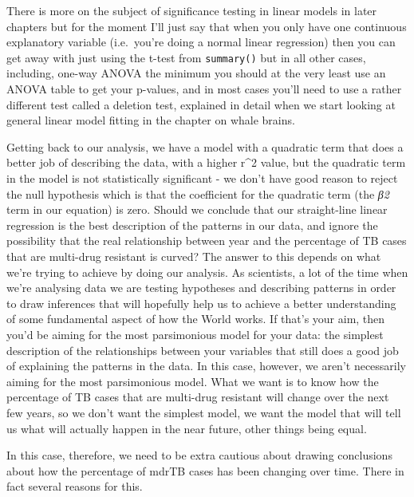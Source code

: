 \documentclass[
]{book}
\begin{document}
There is more on the subject of significance testing in linear models in later chapters but for the moment I'll just say that when you only have one continuous explanatory variable (i.e.~you're doing a normal linear regression) then you can get away with just using the t-test from \texttt{summary()} but in all other cases, including, one-way ANOVA the minimum you should at the very least use an ANOVA table to get your p-values, and in most cases you'll need to use a rather different test called a deletion test, explained in detail when we start looking at general linear model fitting in the chapter on whale brains.

Getting back to our analysis, we have a model with a quadratic term that does a better job of describing the data, with a higher r\^{}2 value, but the quadratic term in the model is not statistically significant - we don't have good reason to reject the null hypothesis which is that the coefficient for the quadratic term (the \emph{β2} term in our equation) is zero. Should we conclude that our straight-line linear regression is the best description of the patterns in our data, and ignore the possibility that the real relationship between year and the percentage of TB cases that are multi-drug resistant is curved? The answer to this depends on what we're trying to achieve by doing our analysis. As scientists, a lot of the time when we're analysing data we are testing hypotheses and describing patterns in order to draw inferences that will hopefully help us to achieve a better understanding of some fundamental aspect of how the World works. If that's your aim, then you'd be aiming for the most parsimonious model for your data: the simplest description of the relationships between your variables that still does a good job of explaining the patterns in the data. In this case, however, we aren't necessarily aiming for the most parsimonious model. What we want is to know how the percentage of TB cases that are multi-drug resistant will change over the next few years, so we don't want the simplest model, we want the model that will tell us what will actually happen in the near future, other things being equal.

In this case, therefore, we need to be extra cautious about drawing conclusions about how the percentage of mdrTB cases has been changing over time. There in fact several reasons for this.
\end{document}
